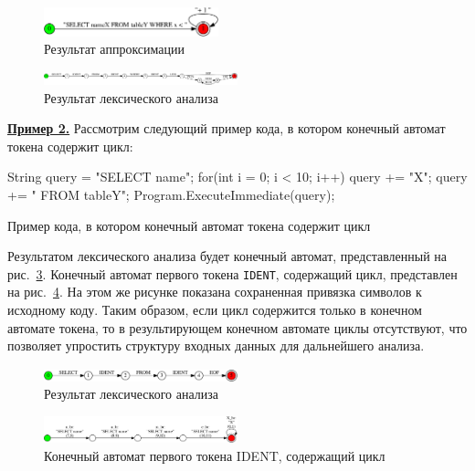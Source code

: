 \documentclass[10pt, conference, compsocconf]{IEEEtran}
\begin{document}
\begin{figure}[h]
\centering
\includegraphics[width=0.45\textwidth]{pics/while_appr}
\caption{Результат аппроксимации}
\label{fig:while_appr}
\end{figure}


\begin{figure}[h]
\centering
\includegraphics[width=0.5\textwidth]{pics/WhileEx}
\caption{Результат лексического анализа}
\label{fig:while_lex}
\end{figure}

\textbf{\underline{Пример 2.}}
Рассмотрим следующий пример кода, в котором конечный автомат токена содержит цикл:
\begin{listing}[H]
\begin{pyglist}[language=csharp,numbers=none,numbersep=5pt]
String query = "SELECT name";
for(int i = 0; i < 10; i++){
   query  += "X";
}
query += " FROM tableY";
Program.ExecuteImmediate(query);
\end{pyglist}
\caption{Пример кода, в котором конечный автомат токена содержит цикл}
\label{lst:exampleFor}
\end{listing}

Результатом лексического анализа будет конечный автомат, представленный на рис.~\ref{fig:token_ex}. Конечный автомат первого токена \verb|IDENT|, содержащий цикл, представлен на рис.~\ref{fig:token_lex}. На этом же рисунке показана сохраненная привязка символов к исходному коду. Таким образом, если цикл содержится только в конечном автомате токена, то в результирующем конечном автомате циклы отсутствуют, что позволяет упростить структуру входных данных для дальнейшего анализа.

\begin{figure}[h]
\centering
\includegraphics[width=0.5\textwidth]{pics/TokenEx}
\caption{Результат лексического анализа}
\label{fig:token_ex}
\end{figure}

\begin{figure}[h]
\centering
\includegraphics[width=0.5\textwidth]{pics/token}
\caption{Конечный автомат первого токена IDENT, содержащий цикл}
\label{fig:token_lex}
\end{figure}
\end{document}
